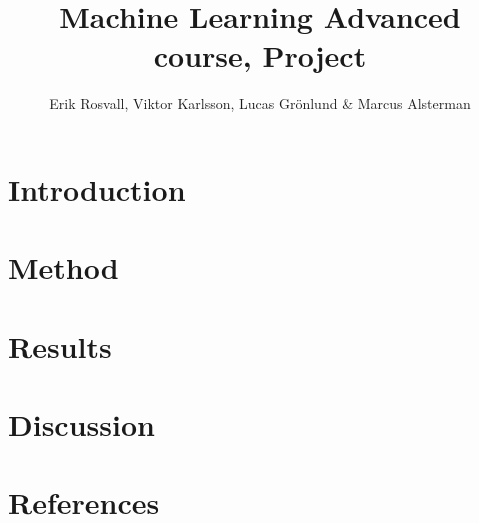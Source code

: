 \documentclass[10pt,a4paper]{report}
\author{Erik Rosvall, Viktor Karlsson, Lucas Grönlund \& Marcus Alsterman}
\title{Machine Learning Advanced course, Project}
\begin{document}
	\maketitle
	
	\section*{Introduction}
	
	
	\section*{Method}
	
	
	\section*{Results}
	
	
	\section*{Discussion}
	
	
	\section*{References}
	
\end{document}
